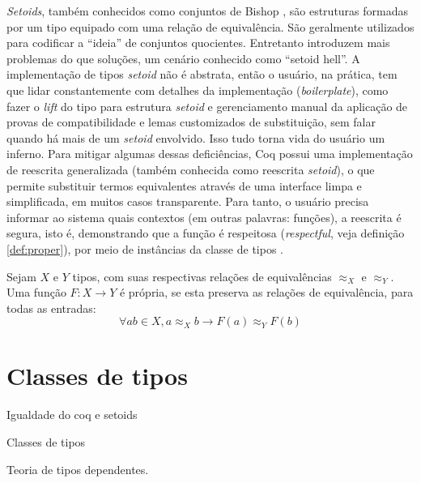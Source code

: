\textit{Setoids}, também conhecidos como conjuntos de Bishop \cite{Barthe2003,Bishop2012}, são estruturas formadas por um tipo equipado com uma relação de equivalência. São geralmente utilizados para codificar a ``ideia'' de conjuntos quocientes. Entretanto introduzem mais problemas do que soluções, um cenário conhecido como ``setoid hell''. A implementação de tipos \textit{setoid} não é abstrata, então o usuário, na prática, tem que lidar constantemente com detalhes da implementação (\textit{boilerplate}), como fazer o \textit{lift} do tipo para estrutura \textit{setoid} e gerenciamento manual da aplicação de provas de compatibilidade e lemas customizados de substituição, sem falar quando há mais de um \textit{setoid} envolvido. Isso tudo torna vida do usuário um inferno. Para mitigar algumas dessas deficiências, Coq \cite{Sozeau2009} possui uma implementação de reescrita generalizada (também conhecida como reescrita \textit{setoid}), o que permite substituir termos equivalentes através de uma interface limpa e simplificada, em muitos casos transparente. Para tanto, o usuário precisa informar ao sistema quais contextos (em outras palavras: funções), a reescrita é segura, isto é, demonstrando que a função é respeitosa (\textit{respectful}, veja definição \ref{def:proper}), por meio de instâncias da classe de tipos .
\begin{definicao}\label{def:proper}
	Sejam $X$ e $Y$ tipos, com suas respectivas relações de equivalências $\approx_X$ e $\approx_Y$. Uma função $F: X \rightarrow Y$ é própria, se esta preserva as relações de equivalência, para todas as entradas:
	\begin{equation*}
		\forall a b \in X, a \approx_X b \rightarrow F(a) \approx_Y F(b)
	\end{equation*}
\end{definicao}

\section{Classes de tipos}

Igualdade do coq e setoids

Classes de tipos


Teoria de tipos dependentes.

